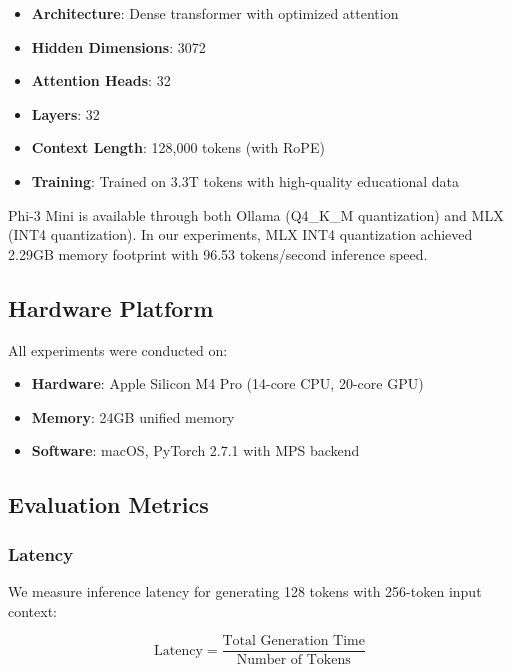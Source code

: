 \documentclass[11pt,a4paper]{article}
\begin{document}
\begin{itemize}[leftmargin=*,nosep]
    \item \textbf{Architecture}: Dense transformer with optimized attention
    \item \textbf{Hidden Dimensions}: 3072
    \item \textbf{Attention Heads}: 32
    \item \textbf{Layers}: 32
    \item \textbf{Context Length}: 128,000 tokens (with RoPE)
    \item \textbf{Training}: Trained on 3.3T tokens with high-quality educational data
\end{itemize}

Phi-3 Mini is available through both Ollama (Q4\_K\_M quantization) and MLX (INT4 quantization). In our experiments, MLX INT4 quantization achieved 2.29GB memory footprint with 96.53 tokens/second inference speed.


\subsection{Hardware Platform}

All experiments were conducted on:

\begin{itemize}[leftmargin=*,nosep]
    \item \textbf{Hardware}: Apple Silicon M4 Pro (14-core CPU, 20-core GPU)
    \item \textbf{Memory}: 24GB unified memory
    \item \textbf{Software}: macOS, PyTorch 2.7.1 with MPS backend
\end{itemize}


\subsection{Evaluation Metrics}


\subsubsection{Latency}

We measure inference latency for generating 128 tokens with 256-token input context:

\begin{equation}
\text{Latency} = \frac{\text{Total Generation Time}}{\text{Number of Tokens}}
\end{equation}
\end{document}
